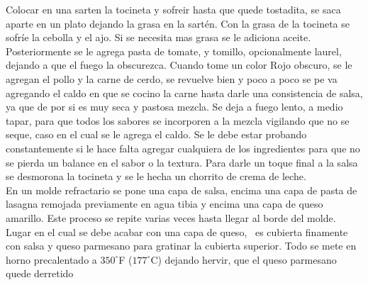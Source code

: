 Colocar en una sarten la tocineta y sofreir hasta que quede tostadita, se saca aparte en un plato dejando la grasa en la sartén. Con la grasa de la tocineta se sofríe la cebolla y el ajo. Si se necesita mas grasa se le adiciona aceite. Posteriormente se le agrega pasta de tomate, y tomillo, opcionalmente laurel, dejando a que el fuego la obscurezca. Cuando tome un color Rojo obscuro, se le agregan el pollo y la carne de cerdo, se revuelve bien y poco a poco se pe va agregando el caldo en que se cocino la carne hasta darle una consistencia de salsa, ya que de por si es muy seca y pastosa mezcla. Se deja a fuego lento, a medio tapar, para que todos los sabores se incorporen a la mezcla vigilando que no se seque, caso en el cual se le agrega el caldo. Se le debe estar probando constantemente si le hace falta agregar cualquiera de los ingredientes para que no se pierda un balance en el sabor o la textura. Para darle un toque final a la salsa se desmorona la tocineta y se le hecha un chorrito de crema de leche.\\

En un molde refractario se pone una capa de salsa, encima una capa de pasta de lasagna remojada previamente en agua tibia y encima una capa de queso amarillo. Este proceso se repite varias veces hasta llegar al borde del molde. Lugar en el cual se debe acabar con una capa de queso,  es cubierta finamente con salsa y queso parmesano para gratinar la cubierta superior. Todo se mete en horno precalentado a $350^\circ$F ($177^\circ$C) dejando hervir, que el queso parmesano quede derretido\\





